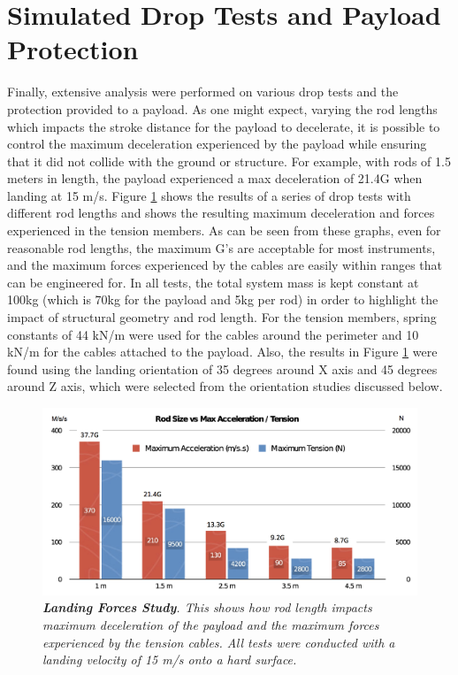 \section{Simulated Drop Tests and Payload Protection}

Finally, extensive analysis were performed on  various drop tests and the protection provided to a payload.   As one might expect, varying the rod lengths which impacts the stroke distance for the payload to decelerate, it is possible to control the maximum deceleration experienced by the payload while ensuring that it did not collide with the ground or structure.  For example, with rods of 1.5 meters in length, the payload experienced a max deceleration of 21.4G when landing at 15 m/s. Figure \ref{fig:rodvsG} shows the results of a series of drop tests with different rod lengths and shows the resulting maximum deceleration and forces experienced in the tension members.   As can be seen from these graphs, even for reasonable rod lengths, the maximum G's are acceptable for most instruments, and the maximum forces experienced by the cables are easily within ranges that can be engineered for.  In all tests, the total system mass is kept constant at 100kg (which is 70kg for the payload and 5kg per rod) in order to highlight the impact of structural geometry and rod length.  For the tension members, spring constants of 44 kN/m were used for the cables around the perimeter and 10 kN/m for the cables attached to the payload.  Also, the results in Figure \ref{fig:rodvsG} were found using the landing orientation of 35 degrees around X axis and 45 degrees around Z axis, which were selected from the orientation studies discussed below. 

\begin{figure}[htbp]
\centering
\includegraphics[width=0.8\columnwidth]{tex/images/rodvsG_fixed2}
\caption{{\em {\bf Landing Forces Study}. This shows how rod length impacts maximum deceleration of the payload and  the maximum forces experienced by the tension cables.  All tests were conducted with a landing velocity of 15 m/s onto a hard surface.}}
\label{fig:rodvsG}
\end{figure}

